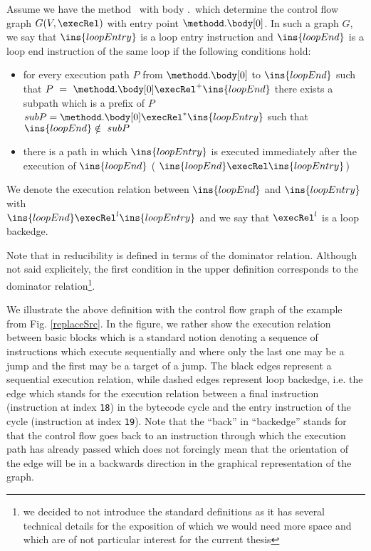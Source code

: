 \begin{defLoop}
\label{defLoop}
Assume we have the method \methodd \ with body \methodd.\body \ which determine the control flow graph $G(V, \execRel) $
with entry point $\methodd.\body[0]$.
 In such a graph $G$, we say that $\ins{loopEntry}$ is a loop entry instruction and $\ins{loopEnd}$ is a loop end instruction
 of the same loop if the following conditions hold:
\begin{itemize}
\item for every execution path $P$ from $\methodd.\body[0]$ to  $\ins{loopEnd}$ such that
     $P~=~\methodd.\body[0] \execRel^{+} \ins{loopEnd}$
     there exists a subpath which is a prefix of $P$  $subP = \methodd.\body[0] \execRel^{*} \ins{loopEntry}$ such that $\ins{loopEnd} \notin  \ subP  $
\item there is a path in which $\ins{loopEntry}$  is executed immediately after the execution of $\ins{loopEnd}$ ( $\ins{loopEnd} \execRel \ins{loopEntry}$)
\end{itemize}
We denote the execution relation between $\ins{loopEnd}$ and  $\ins{loopEntry}$ with \\
$\ins{loopEnd} \execRel^l \ins{loopEntry}$ and we say that $  \execRel^l $  is a loop backedge. 
\end{defLoop}
Note  that  in  \cite{ARUCom1986}  reducibility is defined in terms of the dominator relation. 
Although  not said explicitely, the first condition in the upper definition corresponds to the dominator relation\footnote{we decided to not introduce the standard
definitions as it has several technical details for the exposition of which we would need more space and which are of not particular interest for the current thesis}.

We illustrate the above definition with the control flow graph of the example from Fig. \ref{replaceSrc}.%
In the figure, we rather show the execution relation between basic blocks which is a standard notion denoting a sequence of instructions which execute sequentially
and  where only the last one may be a jump and the first may be a target of a jump. 
The black edges represent a sequential execution relation, while dashed edges represent  loop backedge, i.e. the edge which stands for the execution
relation between a final instruction (instruction at index \texttt{18}) in the bytecode cycle and the entry instruction of the cycle (instruction at index \texttt{19}).  
Note that the ``back'' in ``backedge'' stands for  that the control flow goes back to an instruction through which 
the execution path has already passed which does not forcingly mean that the orientation of the edge will be in a backwards direction in the graphical representation 
of the graph. 

